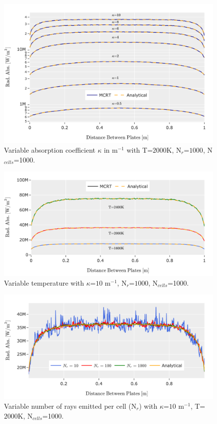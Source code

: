 \begin{figure}
\centering
\includegraphics[width=0.90\linewidth]{figures/ch4/PPcomparison1.png}
\caption{Variable absorption coefficient $\kappa{}$ in m$^{-1}$ with T=$2000$K, N$_r$=$1000$, N$_{cells}$=1000.}
\label{fig:PPcomp_kappa}
\end{figure}

\begin{figure}
\centering
\includegraphics[width=0.90\linewidth]{figures/ch4/PPcomparison2.png}
\caption{Variable temperature with $\kappa{}$=$10$ m$^{-1}$, N$_r$=$1000$, N$_{cells}$=1000.}
\label{fig:PPcomp_temp}
\end{figure}

\begin{figure}
\centering
\includegraphics[width=0.90\linewidth]{figures/ch4/PPcomparison3.png}
\caption{Variable number of rays emitted per cell (N$_r$) with $\kappa{}$=$10$ m$^{-1}$, T=$2000$K, N$_{cells}$=1000.}
\label{fig:PPcom_nrays}
\end{figure}

